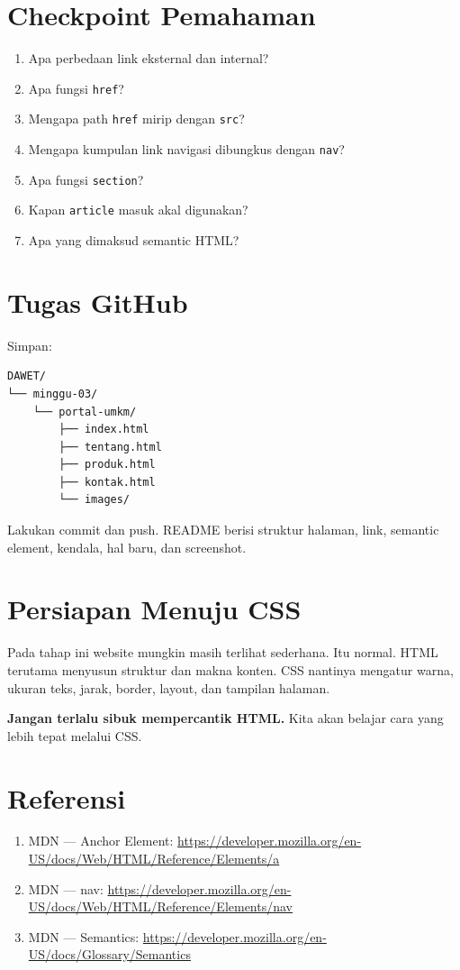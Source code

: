 \documentclass[11pt,a4paper]{article}
\begin{document}
\section{Checkpoint Pemahaman}
\begin{enumerate}
\item Apa perbedaan link eksternal dan internal?
\item Apa fungsi \texttt{href}?
\item Mengapa path \texttt{href} mirip dengan \texttt{src}?
\item Mengapa kumpulan link navigasi dibungkus dengan \texttt{nav}?
\item Apa fungsi \texttt{section}?
\item Kapan \texttt{article} masuk akal digunakan?
\item Apa yang dimaksud semantic HTML?
\end{enumerate}

\section{Tugas GitHub}
Simpan:
\begin{lstlisting}[style=htmlstyle]
DAWET/
└── minggu-03/
    └── portal-umkm/
        ├── index.html
        ├── tentang.html
        ├── produk.html
        ├── kontak.html
        └── images/
\end{lstlisting}
Lakukan commit dan push. README berisi struktur halaman, link, semantic element, kendala, hal baru, dan screenshot.

\section{Persiapan Menuju CSS}
Pada tahap ini website mungkin masih terlihat sederhana. Itu normal. HTML terutama menyusun struktur dan makna konten. CSS nantinya mengatur warna, ukuran teks, jarak, border, layout, dan tampilan halaman.
\begin{conceptbox}\textbf{Jangan terlalu sibuk mempercantik HTML.} Kita akan belajar cara yang lebih tepat melalui CSS.
\end{conceptbox}

\section{Referensi}
\begin{enumerate}
\item MDN — Anchor Element: \url{https://developer.mozilla.org/en-US/docs/Web/HTML/Reference/Elements/a}
\item MDN — nav: \url{https://developer.mozilla.org/en-US/docs/Web/HTML/Reference/Elements/nav}
\item MDN — Semantics: \url{https://developer.mozilla.org/en-US/docs/Glossary/Semantics}
\end{enumerate}
\end{document}
